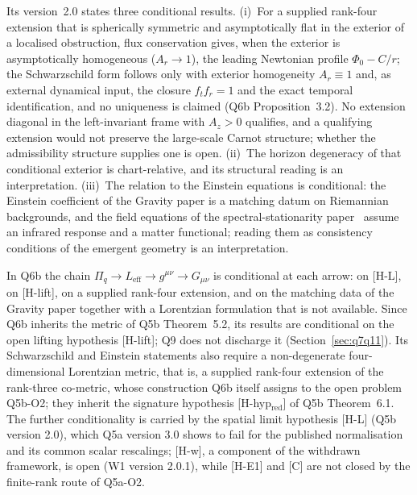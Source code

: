 \documentclass[11pt,a4paper]{article}
\theoremstyle{definition}
\newcommand{\Leff}{L_{\mathrm{eff}}}
\newcommand{\geff}{g^{\mu\nu}}
\begin{document}
      Its version~2.0 states three conditional results.
      (i)~For a supplied rank-four extension that is spherically symmetric and asymptotically flat in
      the exterior of a localised obstruction, flux conservation gives, when the exterior is asymptotically
      homogeneous ($A_r \to 1$), the leading Newtonian profile $\Phi_0 - C/r$; the Schwarzschild form follows
      only with exterior homogeneity $A_r \equiv 1$ and, as external dynamical input, the closure $f_t f_r = 1$
      and the exact temporal identification, and no uniqueness is claimed (Q6b Proposition~3.2).
      No extension diagonal in the left-invariant frame with $A_z > 0$ qualifies, and a qualifying extension
      would not preserve the large-scale Carnot structure; whether the admissibility structure supplies one is
      open.
      (ii)~The horizon degeneracy of that conditional exterior is chart-relative, and its structural
      reading is an interpretation.
      (iii)~The relation to the Einstein equations is conditional: the Einstein coefficient of the
      Gravity paper is a matching datum on Riemannian backgrounds, and the field equations of the
      spectral-stationarity paper~\cite{Beau2026Thermodynamics} assume an infrared response and a matter
      functional; reading them as consistency conditions of the emergent geometry is an interpretation.

      In Q6b the chain $\Pi_q \to \Leff \to \geff \to G_{\mu\nu}$ is conditional at each arrow: on [H-L],
      on [H-lift], on a supplied rank-four extension, and on the matching data of the Gravity paper together with
      a Lorentzian formulation that is not available.
      Since Q6b inherits the metric of Q5b Theorem~5.2, its results are conditional on the open
      lifting hypothesis [H-lift]; Q9 does not discharge it (Section~\ref{sec:q7q11}).
      Its Schwarzschild and Einstein statements also require a non-degenerate four-dimensional
      Lorentzian metric, that is, a supplied rank-four extension of the rank-three co-metric,
      whose construction Q6b itself assigns to the open problem Q5b-O2; they inherit the
      signature hypothesis [H-hyp$_{\mathrm{red}}$] of Q5b Theorem~6.1.
      The further conditionality is carried by the spatial limit hypothesis [H-L]
      (Q5b version 2.0), which Q5a version 3.0 shows to fail for the published normalisation
      and its common scalar rescalings; [H-w], a component of the withdrawn framework, is open
      (W1 version 2.0.1), while [H-E1] and [C] are not closed by the finite-rank route of
      Q5a-O2.
\end{document}
